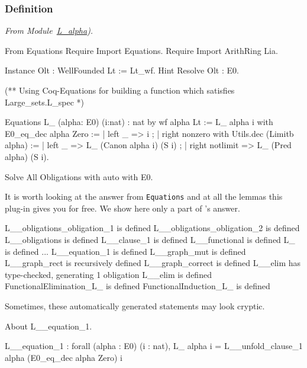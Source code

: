 \subsubsection{Definition}



\vspace{4pt}
\noindent
\emph{From Module~\href{../theories/html/hydras.Epsilon0.L_alpha.html\#L_}{L\_alpha}).}

\label{Functions:L-alpha}
\begin{Coqsrc}
From Equations Require Import Equations.
Require Import ArithRing Lia.

Instance Olt : WellFounded Lt := Lt_wf.
Hint Resolve Olt : E0.

(** Using Coq-Equations for building a function which satisfies 
    Large_sets.L_spec *)

Equations  L_ (alpha: E0) (i:nat) :  nat  by wf  alpha Lt :=
  L_ alpha  i with E0_eq_dec alpha Zero :=
    { | left _ =>  i ;
      | right nonzero
          with Utils.dec (Limitb alpha) :=
          { | left _ =>  L_ (Canon alpha i)  (S i) ;
            | right notlimit =>  L_ (Pred alpha) (S i)}}.

Solve All Obligations with auto with E0.
\end{Coqsrc}

It is worth looking at the answer from \texttt{Equations} and at all the lemmas this plug-in gives you for free. We show here only a part of \coq's answer.


\begin{Coqanswer}
L__obligations_obligation_1 is defined
L__obligations_obligation_2 is defined
L__obligations is defined
L__clause_1 is defined
L__functional is defined
L_ is defined
...
L__equation_1 is defined
L__graph_mut is defined
L__graph_rect is recursively defined
L__graph_correct is defined
L__elim has type-checked, generating 1 obligation
L__elim is defined
FunctionalElimination_L_ is defined
FunctionalInduction_L_ is defined
\end{Coqanswer}

Sometimes, these automatically generated statements may look cryptic. 

\begin{Coqsrc}
About L__equation_1.
\end{Coqsrc}

\begin{Coqanswer}
L__equation_1 :
forall (alpha : E0) (i : nat),
L_ alpha i = L__unfold_clause_1 alpha (E0_eq_dec alpha Zero) i
\end{Coqanswer}


